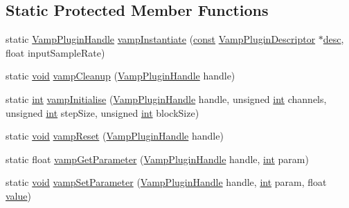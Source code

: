 \subsection*{Static Protected Member Functions}
\begin{DoxyCompactItemize}
\item 
static \hyperlink{vamp_8h_ad3be2952b1f4ad7d775940a6db75c79b}{Vamp\+Plugin\+Handle} \hyperlink{class_vamp_1_1_plugin_adapter_base_1_1_impl_a8cf9e01074559a6b23064d920629dd55}{vamp\+Instantiate} (\hyperlink{getopt1_8c_a2c212835823e3c54a8ab6d95c652660e}{const} \hyperlink{vamp_8h_aa1d6e0792099b9516a89b5fb7ed2ad2b}{Vamp\+Plugin\+Descriptor} $\ast$\hyperlink{_export_p_c_m_8cpp_a717c8108dd6ce1ecc369d9bac2f471f2}{desc}, float input\+Sample\+Rate)
\item 
static \hyperlink{sound_8c_ae35f5844602719cf66324f4de2a658b3}{void} \hyperlink{class_vamp_1_1_plugin_adapter_base_1_1_impl_a198dddb40f4fedc71f8ec45088d22d93}{vamp\+Cleanup} (\hyperlink{vamp_8h_ad3be2952b1f4ad7d775940a6db75c79b}{Vamp\+Plugin\+Handle} handle)
\item 
static \hyperlink{xmltok_8h_a5a0d4a5641ce434f1d23533f2b2e6653}{int} \hyperlink{class_vamp_1_1_plugin_adapter_base_1_1_impl_a210cd61fc3fd8f66eda087a6d726cd2b}{vamp\+Initialise} (\hyperlink{vamp_8h_ad3be2952b1f4ad7d775940a6db75c79b}{Vamp\+Plugin\+Handle} handle, unsigned \hyperlink{xmltok_8h_a5a0d4a5641ce434f1d23533f2b2e6653}{int} channels, unsigned \hyperlink{xmltok_8h_a5a0d4a5641ce434f1d23533f2b2e6653}{int} step\+Size, unsigned \hyperlink{xmltok_8h_a5a0d4a5641ce434f1d23533f2b2e6653}{int} block\+Size)
\item 
static \hyperlink{sound_8c_ae35f5844602719cf66324f4de2a658b3}{void} \hyperlink{class_vamp_1_1_plugin_adapter_base_1_1_impl_a9dc6a2cc51118525c50583e2f7ac339a}{vamp\+Reset} (\hyperlink{vamp_8h_ad3be2952b1f4ad7d775940a6db75c79b}{Vamp\+Plugin\+Handle} handle)
\item 
static float \hyperlink{class_vamp_1_1_plugin_adapter_base_1_1_impl_ae3791f409c626f856133d1ed473dbcdd}{vamp\+Get\+Parameter} (\hyperlink{vamp_8h_ad3be2952b1f4ad7d775940a6db75c79b}{Vamp\+Plugin\+Handle} handle, \hyperlink{xmltok_8h_a5a0d4a5641ce434f1d23533f2b2e6653}{int} param)
\item 
static \hyperlink{sound_8c_ae35f5844602719cf66324f4de2a658b3}{void} \hyperlink{class_vamp_1_1_plugin_adapter_base_1_1_impl_a96a4f1c8359479d41e9b9c3438b561a6}{vamp\+Set\+Parameter} (\hyperlink{vamp_8h_ad3be2952b1f4ad7d775940a6db75c79b}{Vamp\+Plugin\+Handle} handle, \hyperlink{xmltok_8h_a5a0d4a5641ce434f1d23533f2b2e6653}{int} param, float \hyperlink{lib_2expat_8h_a4a30a13b813682e68c5b689b45c65971}{value})

\end{DoxyCompactItemize}

